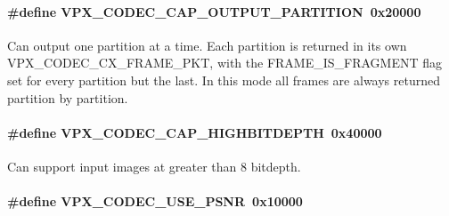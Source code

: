 \paragraph[{\texorpdfstring{V\+P\+X\+\_\+\+C\+O\+D\+E\+C\+\_\+\+C\+A\+P\+\_\+\+O\+U\+T\+P\+U\+T\+\_\+\+P\+A\+R\+T\+I\+T\+I\+ON}{VPX_CODEC_CAP_OUTPUT_PARTITION}}]{\setlength{\rightskip}{0pt plus 5cm}\#define V\+P\+X\+\_\+\+C\+O\+D\+E\+C\+\_\+\+C\+A\+P\+\_\+\+O\+U\+T\+P\+U\+T\+\_\+\+P\+A\+R\+T\+I\+T\+I\+ON~0x20000}\hypertarget{group__encoder_ga69768adb51faa28d98870cbc77e9ea93}{}\label{group__encoder_ga69768adb51faa28d98870cbc77e9ea93}
Can output one partition at a time. Each partition is returned in its own V\+P\+X\+\_\+\+C\+O\+D\+E\+C\+\_\+\+C\+X\+\_\+\+F\+R\+A\+M\+E\+\_\+\+P\+KT, with the F\+R\+A\+M\+E\+\_\+\+I\+S\+\_\+\+F\+R\+A\+G\+M\+E\+NT flag set for every partition but the last. In this mode all frames are always returned partition by partition. 
\paragraph[{\texorpdfstring{V\+P\+X\+\_\+\+C\+O\+D\+E\+C\+\_\+\+C\+A\+P\+\_\+\+H\+I\+G\+H\+B\+I\+T\+D\+E\+P\+TH}{VPX_CODEC_CAP_HIGHBITDEPTH}}]{\setlength{\rightskip}{0pt plus 5cm}\#define V\+P\+X\+\_\+\+C\+O\+D\+E\+C\+\_\+\+C\+A\+P\+\_\+\+H\+I\+G\+H\+B\+I\+T\+D\+E\+P\+TH~0x40000}\hypertarget{group__encoder_ga8edce93a29457f2de6c0f92e3b3c192d}{}\label{group__encoder_ga8edce93a29457f2de6c0f92e3b3c192d}
Can support input images at greater than 8 bitdepth. 
\paragraph[{\texorpdfstring{V\+P\+X\+\_\+\+C\+O\+D\+E\+C\+\_\+\+U\+S\+E\+\_\+\+P\+S\+NR}{VPX_CODEC_USE_PSNR}}]{\setlength{\rightskip}{0pt plus 5cm}\#define V\+P\+X\+\_\+\+C\+O\+D\+E\+C\+\_\+\+U\+S\+E\+\_\+\+P\+S\+NR~0x10000}\hypertarget{group__encoder_ga57bb9eb1881c7e4bf86580660a5e40a0}{}\label{group__encoder_ga57bb9eb1881c7e4bf86580660a5e40a0}


